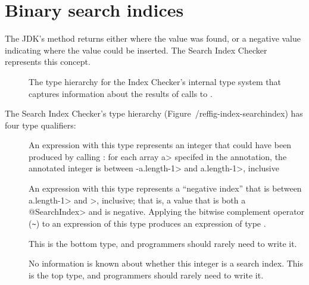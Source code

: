 \section{Binary search indices\label{index-searchindex}}

The JDK's
method returns either where the value was found, or a negative value
indicating where the value could be inserted.  The Search Index Checker
represents this concept.

\begin{figure}
\begin{center}
  \hfill
  \hfill
\end{center}
  \caption{The type hierarchy for the Index Checker's internal type system
  that captures information about the results of calls to
  .}
  \label{fig-index-searchindex}
\end{figure}

The Search Index Checker's type hierarchy (Figure~/ref{fig-index-searchindex}) has four type qualifiers:
\begin{description}
\item[]
  An expression with this type represents an integer that could have been
  produced by calling
  :
  for each array \<a> specifed in the annotation, the annotated integer is
  between \<-a.length-1> and \<a.length-1>, inclusive
\item[]
  An expression with this type represents a ``negative index'' that is
  between \<a.length-1> and >, inclusive; that is, a value that is both
  a \<@SearchIndex> and is negative.  Applying the bitwise complement
  operator (\verb|~|) to an expression of this type produces an expression
  of type .
\item[]
  This is the bottom type, and programmers should rarely need to write it.
\item[]
  No information is known about whether this integer is a search index.
  This is the top type, and programmers should rarely need to write it.
\end{description}


